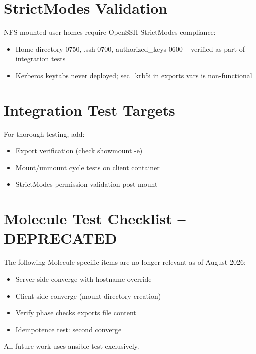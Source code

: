 \section{StrictModes Validation}

NFS-mounted user homes require OpenSSH StrictModes compliance:
\begin{itemize}
    \item Home directory 0750, .ssh 0700, authorized\_keys 0600 -- verified as part of integration tests
    \item Kerberos keytabs never deployed; sec=krb5i in exports vars is non-functional
\end{itemize}

\section{Integration Test Targets}

For thorough testing, add:

\begin{itemize}
    \item Export verification (check showmount -e)
    \item Mount/unmount cycle tests on client container
    \item StrictModes permission validation post-mount
\end{itemize}

\section{Molecule Test Checklist -- DEPRECATED}

The following Molecule-specific items are no longer relevant as of August 2026:
\begin{itemize}
    \item [DEPRECATED] Server-side converge with hostname override
    \item [DEPRECATED] Client-side converge (mount directory creation)
    \item [DEPRECATED] Verify phase checks exports file content
    \item [DEPRECATED] Idempotence test: second converge
\end{itemize}

All future work uses ansible-test exclusively.
